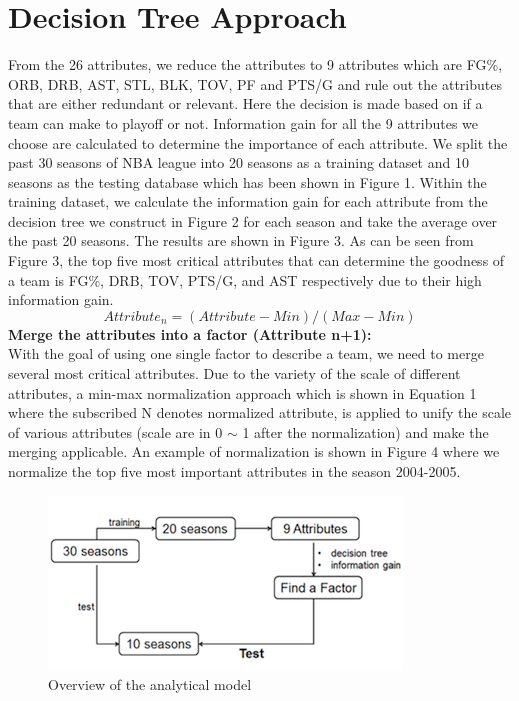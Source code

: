 \documentclass{acm_proc_article-sp}
\begin{document}
\section*{Decision Tree Approach}
From the 26 attributes, we reduce the attributes to 9 attributes which are FG\%, ORB, DRB, AST, STL, BLK, TOV, PF and PTS/G and rule out the attributes that are either redundant or relevant. Here the decision is made based on if a team can make to playoff or not. Information gain for all the 9 attributes we choose are calculated to determine the importance of each attribute. We split the past 30 seasons of NBA league into 20 seasons as a training dataset and 10 seasons as the testing database which has been shown in Figure 1. Within the training dataset, we calculate the information gain for each attribute from the decision tree we construct in Figure 2 for each season and take the average over the past 20 seasons. The results are shown in Figure 3. As can be seen from Figure 3, the top five most critical attributes that can determine the goodness of a team is FG\%, DRB, TOV, PTS/G, and AST respectively due to their high information gain.\\
\begin{equation}
Attribute_{n} = (Attribute - Min) / (Max - Min)
\end{equation}
\textbf{Merge the attributes into a factor (Attribute n+1):}\\
With the goal of using one single factor to describe a team, we need to merge several most critical attributes. Due to the variety of the scale of different attributes, a min-max normalization approach which is shown in Equation 1 where the subscribed N denotes normalized attribute, is applied to unify the scale of various attributes (scale are in 0 $\sim$ 1 after the normalization) and make the merging applicable. An example of normalization is shown in Figure 4 where we normalize the top five most important attributes in the season 2004-2005.

\begin{figure}[!htb]
\includegraphics{DatasetTT.png}
\caption{Overview of the analytical model}
\end{figure}
\end{document}
